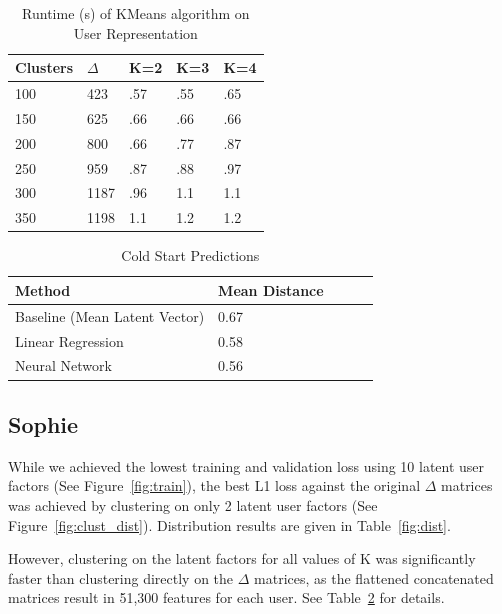 \documentclass{article}
\begin{document}
\begin{table}[t]
\centering
\caption{Runtime (s) of KMeans algorithm on User Representation}
\label{fig:time}
\begin{tabular}{lllll}
                         \multicolumn{1}{l|}{Clusters}& $\Delta$ & K=2 & K=3 & K=4 \\ \hline
\multicolumn{1}{l|}{100} & 423      & .57 & .55 & .65 \\
\multicolumn{1}{l|}{150} & 625      & .66 & .66 & .66 \\
\multicolumn{1}{l|}{200} & 800      & .66 & .77 & .87 \\
\multicolumn{1}{l|}{250} & 959      & .87 & .88 & .97 \\
\multicolumn{1}{l|}{300} & 1187     & .96 & 1.1 & 1.1 \\
\multicolumn{1}{l|}{350} & 1198     & 1.1 & 1.2 & 1.2
\end{tabular}
\end{table}

\begin{table}[t]\label{tbl:cold_start_technique_1}
\centering
\caption{Cold Start Predictions}
\label{fig:time}
\begin{tabular}{lllll}
                         \multicolumn{1}{l|}{Method}& Mean Distance \\ \hline
\multicolumn{1}{l|}{Baseline (Mean Latent Vector)} & 0.67 \\
\multicolumn{1}{l|}{Linear Regression} & 0.58 \\
\multicolumn{1}{l|}{Neural Network} & 0.56 \\

\end{tabular}
\end{table}
\subsection{Sophie}
While we achieved the lowest training and validation loss using 10 latent user factors (See Figure~\ref{fig:train}), the best L1 loss against the original $\Delta$ matrices was achieved by clustering on only 2 latent user factors (See Figure~\ref{fig:clust_dist}).  Distribution results are given in Table~\ref{fig:dist}.

However, clustering on the latent factors for all values of K was significantly faster than clustering directly on the $\Delta$ matrices, as the flattened concatenated matrices result in 51,300 features for each user. See Table~\ref{fig:time} for details.
\end{document}
